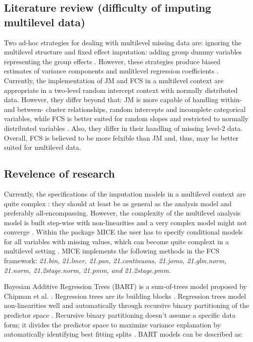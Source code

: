 \documentclass[10pt, a4paper, titlepage]{article}
\begin{document}
\subsection{Literature review (difficulty of imputing multilevel data)}
Two ad-hoc strategies for dealing with multilevel missing data are: ignoring the multilevel structure and fixed effect imputation: adding group dummy variables representing the group effects \cite{ludtke2017, enders2016}. However, these strategies produce biased estimates of variance components and mulitlevel regression coefficients \cite{ludtke2017}. Currently, the implementation of JM and FCS in a multilevel context are appropriate in a two-level random intercept context with normally distributed data. However, they differ beyond that: JM is more capable of handling within- and between- cluster relationships, random intercepts and incomplete categorical variables, while FCS is better suited for random slopes and restricted to normally distributed variables \cite{enders2016}. Also, they differ in their handling of missing level-2 data. Overall, FCS is believed to be more felxible than JM \cite{audigier2018} and, thus, may be better suited for multilevel data.

\subsection{Revelence of research}
Currently, the specifications of the imputation models in a multilevel context are quite complex \cite{buurenFlexibleImputationMissing2018}: they should at least be as general as the analysis model \cite{grund2018} and preferably all-encompassing. However, the complexity of the multilevel analysis model is built step-wise with non-linearities \cite{hox2017} and a very complex model might not converge \cite{buurenFlexibleImputationMissing2018}. Within the package MICE \cite{buuren2011} the user has to specify conditional models for all variables with missing values, which can become quite complext in a multilevel setting \cite{buurenFlexibleImputationMissing2018, burgette2010}. MICE implements the following methods in the FCS framework: \textit{21.bin, 21.lmer, 21.pan, 21.continuous, 21.jomo, 21.glm.norm, 21.norm, 21.2stage.norm, 21.pmm, and 21.2stage.pmm}.

Bayesian Additive Regression Trees (BART) is a sum-of-trees model proposed by Chipman et al. \cite{chipman2010}. Regression trees are its building blocks \cite{chipman2010, hill2020, james2021}. Regression trees model non-linearities well and automatically through recursive binary partitioning of the predictor space \cite{hill2020, burgette2010}. Recursive binary partitioning doesn’t assume a specific data form; it divides the predictor space to maximize variance explanation by automatically identifying best fitting splits \cite{hastie2017, james2021, salditt2023}. BART models can be described as:
\end{document}
